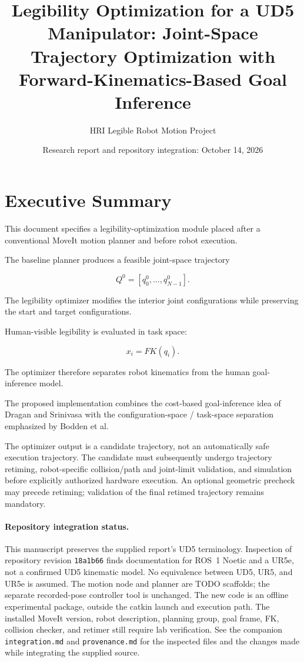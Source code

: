 \documentclass[11pt]{article}
\title{
Legibility Optimization for a UD5 Manipulator:
Joint-Space Trajectory Optimization with
Forward-Kinematics-Based Goal Inference
}
\author{
HRI Legible Robot Motion Project
}
\date{Research report and repository integration: October 14, 2026}
\begin{document}
\maketitle

\section*{Executive Summary}

This document specifies a legibility-optimization module
placed after a conventional MoveIt motion planner and before
robot execution.

The baseline planner produces a feasible joint-space trajectory

\[
Q^0 = [q_0^0,\ldots,q_{N-1}^0].
\]

The legibility optimizer modifies the interior joint
configurations while preserving the start and target
configurations.

Human-visible legibility is evaluated in task space:

\[
x_i = FK(q_i).
\]

The optimizer therefore separates robot kinematics from the
human goal-inference model.

The proposed implementation combines the cost-based
goal-inference idea of Dragan and Srinivasa with the
configuration-space / task-space separation emphasized by
Bodden et al.

The optimizer output is a candidate trajectory, not an
automatically safe execution trajectory. The candidate must
subsequently undergo trajectory retiming, robot-specific collision/path and
joint-limit validation, and simulation before explicitly authorized hardware
execution. An optional geometric precheck may precede retiming; validation
of the final retimed trajectory remains mandatory.

\paragraph{Repository integration status.}
This manuscript preserves the supplied report's UD5 terminology.
Inspection of repository revision \texttt{18a1b66} finds documentation for
ROS~1 Noetic and a UR5e, not a confirmed UD5 kinematic model.
No equivalence between UD5, UR5, and UR5e is assumed.
The motion node and planner are TODO scaffolds; the separate recorded-pose
controller tool is unchanged. The new code is an offline experimental
package, outside the catkin launch and execution path. The installed MoveIt
version, robot description, planning group, goal frame, FK, collision checker,
and retimer still require lab verification. See the companion
\texttt{integration.md} and \texttt{provenance.md} for the inspected files
and the changes made while integrating the supplied source.
\end{document}
